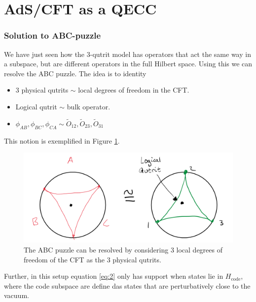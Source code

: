\documentclass[letter,12pt]{article}
\begin{document}
\section{AdS/CFT as a QECC}
\subsubsection*{Solution to ABC-puzzle}
We have just seen how the 3-qutrit model has operators that act the same way in a subspace, but are different operators in the full Hilbert space. Using this we can resolve the ABC puzzle. The idea is to identity 
\begin{itemize}
	\item 3 physical qutrits $\sim$ local degrees of freedom in the CFT.
	\item Logical qutrit $\sim$ bulk operator.
	\item $\phi_{AB},\phi_{BC},\phi_{CA}\sim \tilde{O}_{12},\tilde{O}_{23},\tilde{O}_{31}$
\end{itemize}
This notion is exemplified in Figure \ref{fig:adscftfig5}.
\begin{figure}[H]
	\centering
	\includegraphics[width=0.85\linewidth]{ADS_CFT_Fig5}
	\caption{The ABC puzzle can be resolved by considering 3 local degrees of freedom of the CFT as the 3 physical qutrits.}
	\label{fig:adscftfig5}
\end{figure}
Further, in this setup equation \eqref{eq:2} only has support when states lie in $H_{\text{code}}$, where the code subspace are define das states that are perturbatively close to the vacuum.
\end{document}
